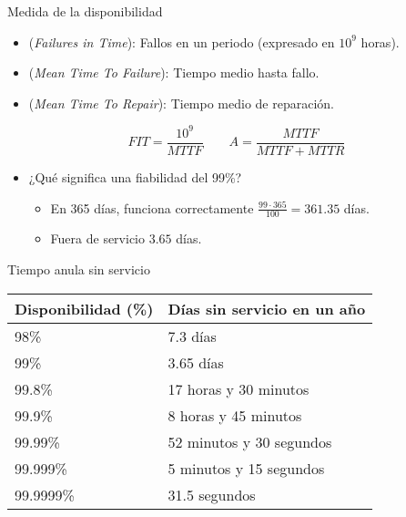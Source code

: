 \begin{frame}[t]{Medida de la disponibilidad}
\begin{itemize}
  \item {} (\emph{Failures in Time}): 
        Fallos en un periodo (expresado en $10^9$ horas).
  \item {} (\emph{Mean Time To Failure}):
        Tiempo medio hasta fallo.
  \item {} (\emph{Mean Time To Repair}):
        Tiempo medio de reparación.
\end{itemize}

\begin{equation*}
FIT = \frac{10^9}{MTTF}
\quad\quad 
A = \frac{MTTF}{MTTF + MTTR}
\end{equation*}

\begin{itemize}
  \item ¿Qué significa una fiabilidad del 99\%?
    \begin{itemize}
      \item En 365 días, funciona correctamente $\frac{99 \cdot 365}{100} = 361.35$ días.
      \item Fuera de servicio $3.65$ días.
    \end{itemize}
\end{itemize}
\end{frame}

\begin{frame}{Tiempo anula sin servicio}
\begin{center}
{\small
\begin{tabular}{|l|l|}
\hline
Disponibilidad (\%) & Días sin servicio en un año\\
\hline
\hline
98\% & 7.3 días\\
\hline
99\% & 3.65 días\\
\hline
99.8\% & 17 horas y 30 minutos\\
\hline
99.9\% & 8 horas y 45 minutos\\
\hline
99.99\% & 52 minutos y 30 segundos\\
\hline
99.999\% & 5 minutos y 15 segundos\\
\hline
99.9999\% & 31.5 segundos\\
\hline
\end{tabular}
}
\end{center}
\end{frame}


